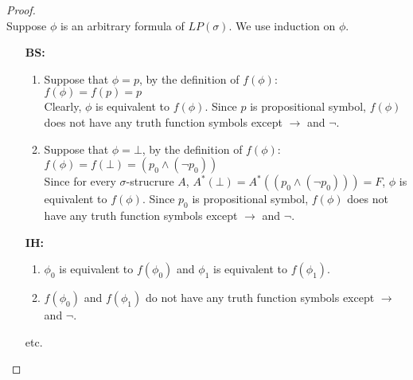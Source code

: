 \documentclass[12pt,a4paper]{article}
\theoremstyle{plain}
\begin{document}
\begin{proof}\ \\
Suppose $\phi$ is an arbitrary formula of $LP(\sigma)$. We use induction on $\phi$.
        \begin{itemize}
            \item[\textbf{BS:}]
                \begin{enumerate}
                    \item 
                        Suppose that $\phi = p$, by the definition of $f(\phi)$:\\
                        $f(\phi)=f(p)=p$\\
                        Clearly, $\phi$ is equivalent to $f(\phi)$. Since $p$ is propositional symbol, $f(\phi)$ does not have any truth function symbols except $\rightarrow$ and $\neg$.
                    \item
                        Suppose that $\phi = \bot$, by the definition of $f(\phi)$:\\
                        $f(\phi)=f(\bot)=(p_0\wedge (\neg p_0))$\\
                        Since for every $\sigma$-strucrure $A$, $A^*(\bot)=A^*((p_0\wedge (\neg p_0)))=F$, $\phi$ is equivalent to $f(\phi)$. Since $p_0$ is propositional symbol, $f(\phi)$ does not have any truth function symbols except $\rightarrow$ and $\neg$.
                 \end{enumerate}
            \item[\textbf{IH:}]
                \begin{enumerate}
                    \item 
                        $\phi_0$ is equivalent to $f(\phi_0)$ and $\phi_1$ is equivalent to $f(\phi_1)$.
                    \item
                        $f(\phi_0)$ and $f(\phi_1)$ do not have any truth function symbols except $\rightarrow$ and $\neg$.
                \end{enumerate}
                etc.
               

\end{itemize}
\end{proof}
\end{document}
